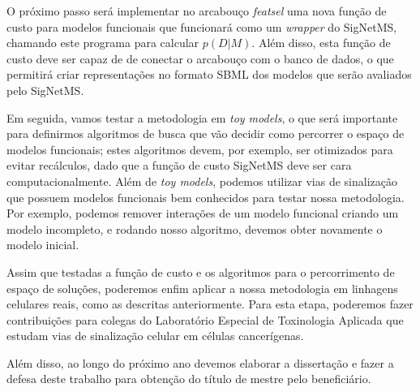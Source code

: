 \documentclass[12pt]{article}
\newcommand{\foreignword}[1]{\textit{#1}}
\begin{document}
O próximo passo será implementar no arcabouço {\em featsel} uma nova
função de custo para modelos funcionais que funcionará como um 
\foreignword{wrapper} do SigNetMS, chamando este programa para calcular 
$p (D | M)$. Além disso, esta função de custo deve ser capaz de de
conectar o arcabouço com o banco de dados, o que permitirá criar 
representações no formato SBML dos modelos que serão avaliados pelo 
SigNetMS. 

Em seguida, vamos testar a metodologia em 
\foreignword{toy models}, o que será importante para definirmos 
algoritmos de busca que vão decidir como percorrer o espaço de modelos
funcionais; estes algoritmos devem, por exemplo, ser otimizados para 
evitar recálculos, dado que a função de custo SigNetMS deve ser cara
computacionalmente. Além de \foreignword{toy models}, podemos utilizar 
vias de sinalização que possuem modelos funcionais bem conhecidos para 
testar nossa metodologia. Por exemplo, podemos remover interações de um 
modelo funcional criando um modelo incompleto, e rodando nosso 
algoritmo, devemos obter novamente o modelo inicial.

Assim que testadas a função de custo e os algoritmos para o 
percorrimento de espaço de soluções, poderemos enfim aplicar a nossa 
metodologia em linhagens celulares reais, como as descritas 
anteriormente. Para esta etapa, poderemos fazer contribuições para 
colegas do Laboratório Especial de Toxinologia Aplicada que estudam
vias de sinalização celular em células cancerígenas.

Além disso, ao longo do próximo ano devemos elaborar a dissertação e 
fazer a defesa deste trabalho para obtenção do título de mestre pelo
beneficiário.
\end{document}
